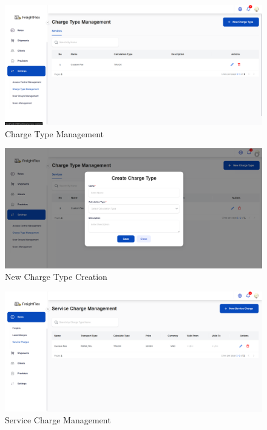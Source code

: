 \begin{figure}[H]
    \centering
    \includegraphics[width=15cm]{graphics/UI/charge-type-management.png}
    \caption{Charge Type Management}
    \label{fig:charge-type-management}
\end{figure}

\begin{figure}[H]
    \centering
    \includegraphics[width=15cm]{graphics/UI/new-charge-type.png}
    \caption{New Charge Type Creation}
    \label{fig:new-charge-type}
\end{figure}

\begin{figure}[H]
    \centering
    \includegraphics[width=15cm]{graphics/UI/service-charge-management.png}
    \caption{Service Charge Management}
    \label{fig:service-charge-management}
\end{figure}

